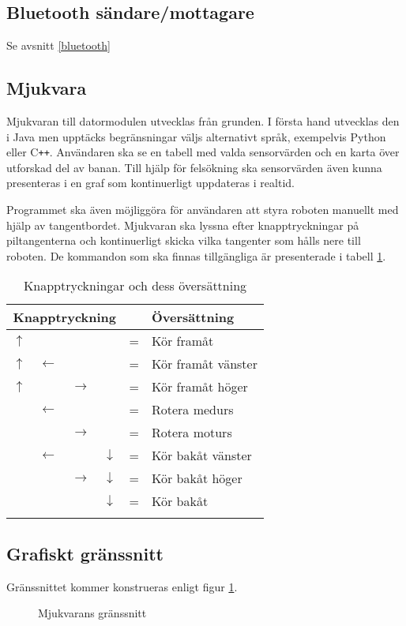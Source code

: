 \documentclass[11pt]{article}
\begin{document}
\begin{flushleft}
\subsection{Bluetooth\textsuperscript{\circledR} sändare/mottagare}
Se avsnitt \ref{bluetooth}
\subsection{Mjukvara}
Mjukvaran till datormodulen utvecklas från grunden. I första hand utvecklas den i Java men upptäcks begränsningar väljs alternativt språk, exempelvis Python eller C\texttt{++}. Användaren ska se en tabell med valda sensorvärden och en karta över utforskad del av banan. Till hjälp för felsökning ska sensorvärden även kunna presenteras i en graf som kontinuerligt uppdateras i realtid. 

Programmet ska även möjliggöra för användaren att styra roboten manuellt med hjälp av tangentbordet. Mjukvaran ska lyssna efter knapptryckningar på piltangenterna och kontinuerligt skicka vilka tangenter som hålls nere till roboten. De kommandon som ska finnas tillgängliga är presenterade i tabell \ref{commands}.

\begin{longtable}{|p{.05\linewidth} p{.05\linewidth} p{.05\linewidth} p{.05\linewidth} c l|}
	\multicolumn{4}{c}{\textbf{Knapptryckning}} & & \multicolumn{1}{l}{\textbf{Översättning}} \\ \hline\hline
	$\uparrow$ &  				&  				& 				& = & Kör framåt \\ \hline
	$\uparrow$ & $\leftarrow$	&				&				& = & Kör framåt vänster \\ \hline
	$\uparrow$ &				& $\rightarrow$	&				& = & Kör framåt höger \\ \hline
			   & $\leftarrow$	&				&				& = & Rotera medurs \\ \hline
			   &				& $\rightarrow$	&				& = & Rotera moturs \\ \hline
			   & $\leftarrow$	&				& $\downarrow$	& = & Kör bakåt vänster \\ \hline
			   &				& $\rightarrow$ & $\downarrow$	& = & Kör bakåt höger \\ \hline
			   &				&				& $\downarrow$	& = & Kör bakåt \\ \hline
	\caption{Knapptryckningar och dess översättning} \label{commands}
\end{longtable}

\subsection{Grafiskt gränssnitt}
Gränssnittet kommer konstrueras enligt figur \ref{software}.
\begin{figure}[htbp]
\centering
\noindent\resizebox{.8\textwidth}{!}{
		}
	\caption{Mjukvarans gränssnitt \label{software}}
\end{figure}


\end{flushleft}
\end{document}
